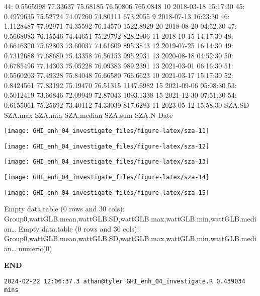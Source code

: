 \documentclass[
  10pt,
  a4paper,oneside]{article}
\begin{document}
44: 0.5565998 77.33637 75.68185 76.50806 765.0848 10 2018-03-18 15:17:30
45: 0.4979635 75.52724 74.07260 74.80111 673.2055 9 2018-07-13 16:23:30
46: 1.1128487 77.92971 74.35592 76.14570 1522.8929 20 2018-08-20 04:52:30
47: 0.5668083 76.15546 74.44651 75.29792 828.2906 11 2018-10-15 14:17:30
48: 0.6646320 75.62803 73.60037 74.61609 895.3843 12 2019-07-25 16:14:30
49: 0.7312688 77.68680 75.43358 76.56153 995.2931 13 2020-08-18 04:52:30
50: 0.6785496 77.14303 75.05228 76.09383 989.2391 13 2021-03-01 06:16:30
51: 0.5560203 77.49328 75.84048 76.66580 766.6623 10 2021-03-17 15:17:30
52: 0.8424561 77.83192 75.19470 76.51315 1147.6982 15 2021-09-06 05:08:30
53: 0.5012419 73.66846 72.09949 72.87043 1093.1338 15 2021-12-30 07:51:30
54: 0.6155061 75.25692 73.40112 74.33039 817.6283 11 2023-05-12 15:58:30
SZA.SD SZA.max SZA.min SZA.median SZA.sum SZA.N Date

\begin{center}\texttt{[image: GHI\_enh\_04\_investigate\_files/figure-latex/sza-11]} \end{center}

\begin{center}\texttt{[image: GHI\_enh\_04\_investigate\_files/figure-latex/sza-12]} \end{center}

\begin{center}\texttt{[image: GHI\_enh\_04\_investigate\_files/figure-latex/sza-13]} \end{center}

\begin{center}\texttt{[image: GHI\_enh\_04\_investigate\_files/figure-latex/sza-14]} \end{center}

\begin{center}\texttt{[image: GHI\_enh\_04\_investigate\_files/figure-latex/sza-15]} \end{center}

Empty data.table (0 rows and 30 cols): Group0,wattGLB.mean,wattGLB.SD,wattGLB.max,wattGLB.min,wattGLB.median\ldots{}
Empty data.table (0 rows and 30 cols): Group0,wattGLB.mean,wattGLB.SD,wattGLB.max,wattGLB.min,wattGLB.median\ldots{}
numeric(0)

\textbf{END}

\begin{verbatim}
2024-02-22 12:06:37.3 athan@tyler GHI_enh_04_investigate.R 0.439034 mins
\end{verbatim}
\end{document}
